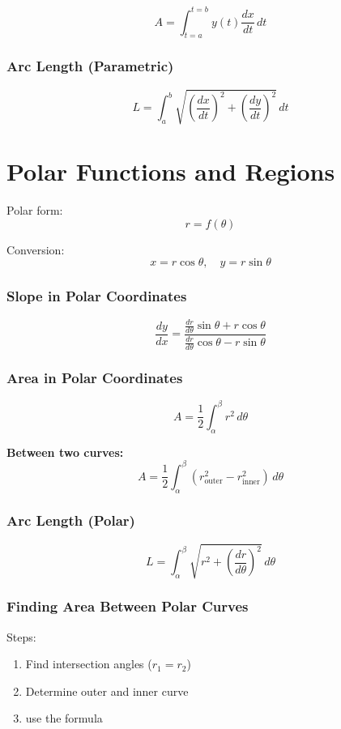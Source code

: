 \documentclass[11pt]{article}
\theoremstyle{mydef}
\begin{document}
\[
A = \int_{t=a}^{t=b} y(t)\frac{dx}{dt}\,dt
\]


\subsubsection*{Arc Length (Parametric)}

\[
L = \int_a^b \sqrt{\left(\frac{dx}{dt}\right)^2 + \left(\frac{dy}{dt}\right)^2}\,dt
\]


\section*{Polar Functions and Regions}

Polar form:
\[
r = f(\theta)
\]

Conversion:
\[
x = r\cos\theta, \quad y = r\sin\theta
\]


\subsubsection*{Slope in Polar Coordinates}

\[
\frac{dy}{dx}
=
\frac{\frac{dr}{d\theta}\sin\theta + r\cos\theta}
{\frac{dr}{d\theta}\cos\theta - r\sin\theta}
\]


\subsubsection*{Area in Polar Coordinates}

\[
A = \frac{1}{2}\int_{\alpha}^{\beta} r^2\,d\theta
\]

\textbf{Between two curves:}
\[
A = \frac{1}{2}\int_{\alpha}^{\beta} \left(r_{\text{outer}}^2 - r_{\text{inner}}^2\right)\,d\theta
\]


\subsubsection*{Arc Length (Polar)}

\[
L = \int_{\alpha}^{\beta} \sqrt{r^2 + \left(\frac{dr}{d\theta}\right)^2}\,d\theta
\]



\subsubsection*{Finding Area Between Polar Curves}

Steps:
\begin{enumerate}
\item Find intersection angles ($r_1 = r_2$)
\item Determine outer and inner curve
\item use the formula
\end{enumerate}
\end{document}
